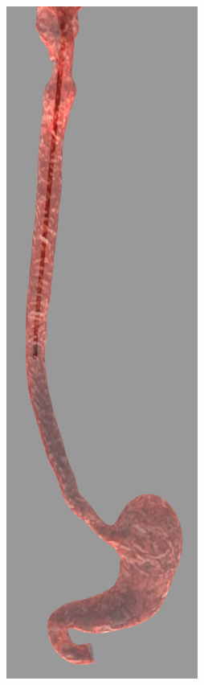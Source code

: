 \documentclass[12pt,a4]{article}
\begin{document}
\begin{figure}[ht!]
\begin{subfigure}{0.15\textwidth}
    \end{subfigure}%
    ~
        \begin{subfigure}{0.15\textwidth}
        \centering
        \includegraphics[width=0.75\linewidth]{figures/GIsnaps/2.png}
       

\end{subfigure}
\end{figure}
\end{document}
